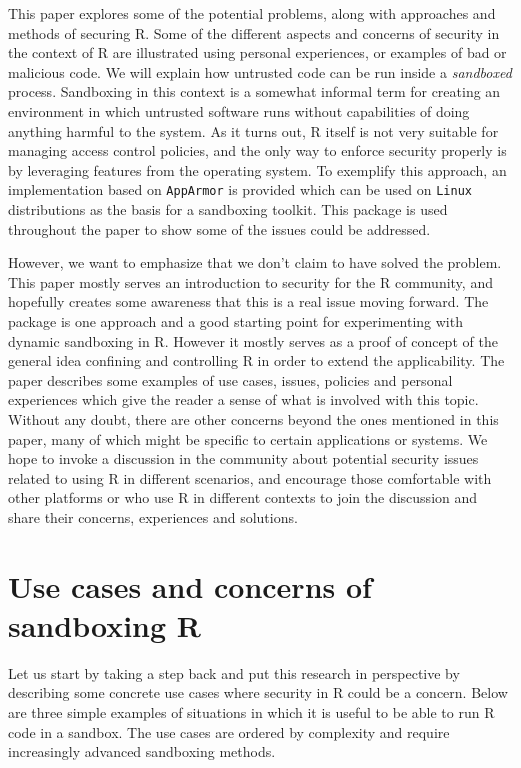 \documentclass[article]{jss}
\newcommand{\R}{\textsf{R}\xspace}
\newcommand{\AppArmor}{\texttt{AppArmor}\xspace}
\newcommand{\RAppArmor}{\pkg{RAppArmor}\xspace}
\newcommand{\Linux}{\texttt{Linux}\xspace}
\begin{document}
This paper explores some of the potential problems, along with approaches and
methods of securing \R. Some of the different aspects and concerns of
security in the context of \R are illustrated using personal
experiences, or examples of bad or malicious code. We will explain how untrusted
code can be run inside a \emph{sandboxed} process. Sandboxing in
this context is a somewhat informal term for creating an environment in which
untrusted software runs without capabilities of doing anything harmful to the
system. As it turns out, \R itself is not very suitable for managing
access control policies, and the only way to enforce security properly is by
leveraging features from the operating system. To exemplify this approach, an
implementation based on \AppArmor is provided which can be
used on \Linux distributions as the basis for a sandboxing toolkit. This package
is used throughout the paper to show some of the issues could be addressed.

However, we want to emphasize that we don't claim to have solved the problem.
This paper mostly serves an introduction to security for the \R
community, and hopefully creates some awareness that this is a real issue moving
forward. The \RAppArmor package is one approach and a good starting point
for experimenting with dynamic sandboxing in \R. However it mostly
serves as a proof of concept of the general idea confining and controlling \R
in order to extend the applicability. The paper describes some examples of use
cases, issues, policies and personal experiences which give the reader a sense
of what is involved with this topic. Without any doubt, there are other concerns
beyond the ones mentioned in this paper, many of which might be specific to
certain applications or systems. We hope to invoke a discussion in the community
about potential security issues related to using \R in
different scenarios, and encourage those comfortable with other platforms or who
use \R in different contexts to join the discussion and share their
concerns, experiences and solutions.

\section[Use cases and concerns of sandboxing R]{Use cases and concerns of
sandboxing \R}

Let us start by taking a step back and put this research in perspective by
describing some concrete use cases where security in \R could be a
concern. Below are three simple examples of situations in which it is useful to
be able to run \R code in a sandbox. The use cases are ordered by
complexity and require increasingly advanced sandboxing methods.
\end{document}
